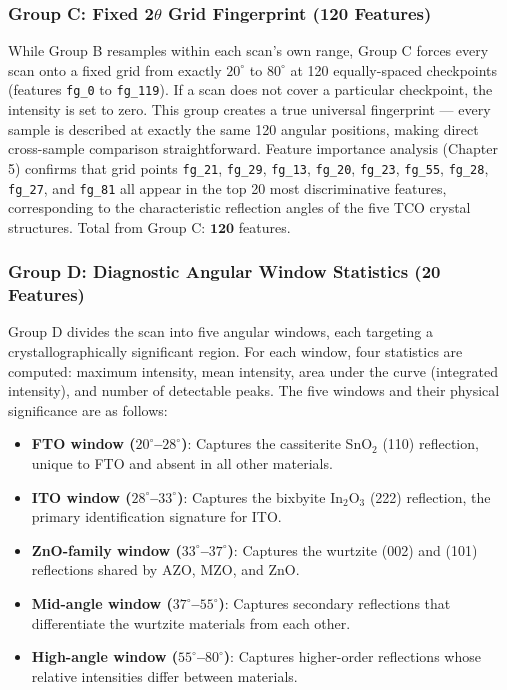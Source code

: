 \documentclass[12pt, oneside]{article} %
\begin{document}
\subsubsection{Group C: Fixed 2$\theta$ Grid Fingerprint (120 Features)}

While Group B resamples within each scan's own range, Group C forces every scan onto a fixed grid from exactly $20^{\circ}$ to $80^{\circ}$ at 120 equally-spaced checkpoints (features \texttt{fg\_0} to \texttt{fg\_119}). If a scan does not cover a particular checkpoint, the intensity is set to zero. This group creates a true universal fingerprint --- every sample is described at exactly the same 120 angular positions, making direct cross-sample comparison straightforward. Feature importance analysis (Chapter 5) confirms that grid points \texttt{fg\_21}, \texttt{fg\_29}, \texttt{fg\_13}, \texttt{fg\_20}, \texttt{fg\_23}, \texttt{fg\_55}, \texttt{fg\_28}, \texttt{fg\_27}, and \texttt{fg\_81} all appear in the top 20 most discriminative features, corresponding to the characteristic reflection angles of the five TCO crystal structures. Total from Group C: $\mathbf{120}$ features.

\subsubsection{Group D: Diagnostic Angular Window Statistics (20 Features)}

Group D divides the scan into five angular windows, each targeting a crystallographically significant region. For each window, four statistics are computed: maximum intensity, mean intensity, area under the curve (integrated intensity), and number of detectable peaks. The five windows and their physical significance are as follows:

\begin{itemize}[itemsep=0mm]
\item \textbf{FTO window ($20^{\circ}$--$28^{\circ}$)}: Captures the cassiterite SnO$_2$ (110) reflection, unique to FTO and absent in all other materials.
\item \textbf{ITO window ($28^{\circ}$--$33^{\circ}$)}: Captures the bixbyite In$_2$O$_3$ (222) reflection, the primary identification signature for ITO.
\item \textbf{ZnO-family window ($33^{\circ}$--$37^{\circ}$)}: Captures the wurtzite (002) and (101) reflections shared by AZO, MZO, and ZnO.
\item \textbf{Mid-angle window ($37^{\circ}$--$55^{\circ}$)}: Captures secondary reflections that differentiate the wurtzite materials from each other.
\item \textbf{High-angle window ($55^{\circ}$--$80^{\circ}$)}: Captures higher-order reflections whose relative intensities differ between materials.
\end{itemize}
\end{document}

